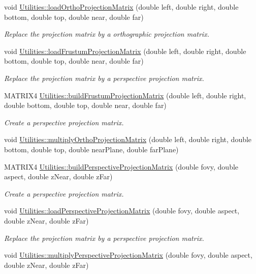 \begin{DoxyCompactItemize}
void \hyperlink{namespace_utilities_ae239a07fe9373e6a079a8c1465cab662}{Utilities::loadOrthoProjectionMatrix} (double left, double right, double bottom, double top, double near, double far)
\begin{DoxyCompactList}\small\item\em Replace the projection matrix by a orthographic projection matrix. \end{DoxyCompactList}\item 
void \hyperlink{namespace_utilities_ad6cddf27e1b4769a998710f48a74026d}{Utilities::loadFrustumProjectionMatrix} (double left, double right, double bottom, double top, double near, double far)
\begin{DoxyCompactList}\small\item\em Replace the projection matrix by a perspective projection matrix. \end{DoxyCompactList}\item 
MATRIX4 \hyperlink{namespace_utilities_aaa85ac0797b49093c4344ce75c4a3265}{Utilities::buildFrustumProjectionMatrix} (double left, double right, double bottom, double top, double near, double far)
\begin{DoxyCompactList}\small\item\em Create a perspective projection matrix. \end{DoxyCompactList}\item 
void \hyperlink{namespace_utilities_ab6a11c99ddae551a4d7bc64d18d63046}{Utilities::multiplyOrthoProjectionMatrix} (double left, double right, double bottom, double top, double nearPlane, double farPlane)
\item 
MATRIX4 \hyperlink{namespace_utilities_ae473d6bd8d417fc07465944092a92938}{Utilities::buildPerspectiveProjectionMatrix} (double fovy, double aspect, double zNear, double zFar)
\begin{DoxyCompactList}\small\item\em Create a perspective projection matrix. \end{DoxyCompactList}\item 
void \hyperlink{namespace_utilities_a72a4f2b2d67dc75de5b6ebbf25248521}{Utilities::loadPerspectiveProjectionMatrix} (double fovy, double aspect, double zNear, double zFar)
\begin{DoxyCompactList}\small\item\em Replace the projection matrix by a perspective projection matrix. \end{DoxyCompactList}\item 
void \hyperlink{namespace_utilities_aaf402e609cb9931c8534ac08968fb49b}{Utilities::multiplyPerspectiveProjectionMatrix} (double fovy, double aspect, double zNear, double zFar)

\end{DoxyCompactItemize}
